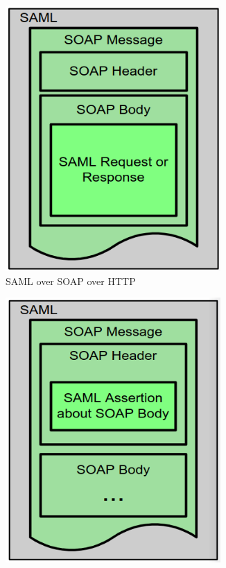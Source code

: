 \begin{figure}[H]
  \centering
  \begin{subfigure}{.4\textwidth}
    \centering
    \includegraphics[width=0.9\textwidth]{img/soap over http.png}
    \caption{SAML over SOAP over HTTP}
  \end{subfigure}
  \begin{subfigure}{.4\textwidth}
    \centering
    \includegraphics[width=0.9\textwidth]{img/soap assertion.png}

\end{subfigure}
\end{figure}

